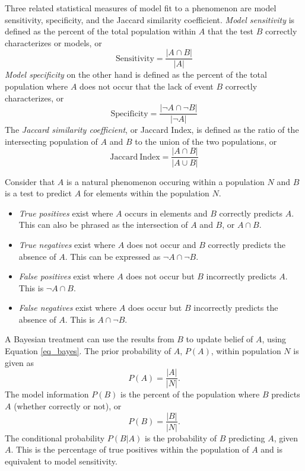\documentclass[12pt,letter]{article}
\begin{document}
Three related statistical measures of model fit to a phenomenon are model sensitivity, specificity, and the Jaccard similarity coefficient. \textit{Model sensitivity} is defined as the percent of the total population within $A$ that the test $B$ correctly characterizes or models, or
\begin{equation}
\mathrm{Sensitivity} = \frac{|A\cap B|}{|A|}\label{eq_sensitivity}
\end{equation}
\textit{Model specificity} on the other hand is defined as the percent of the total population where $A$ does not occur that the lack of event $B$ correctly characterizes, or 
\begin{equation}
\mathrm{Specificity} = \frac{|\neg A\cap \neg B|}{|\neg A|}
\end{equation}
The \textit{Jaccard similarity coefficient}, or Jaccard Index, is defined as the ratio of the intersecting population of $A$ and $B$ to the union of the two populations, or
\begin{equation}
\mathrm{Jaccard~Index} = \frac{|A\cap B|}{|A\cup B|}
\end{equation}

Consider that $A$ is a natural phenomenon occuring within a population $N$ and $B$ is a test to predict $A$ for elements within the population $N$. 
\begin{itemize}
\item \textit{True positives} exist where $A$ occurs in elements and $B$ correctly predicts $A$. This can also be phrased as the intersection of $A$ and $B$, or $A\cap B$.
\item \textit{True negatives} exist where $A$ does not occur and $B$ correctly predicts the absence of $A$. This can be expressed as $\neg A\cap\neg B$.
\item \textit{False positives} exist where $A$ does not occur but $B$ incorrectly predicts $A$. This is $\neg A\cap B$.
\item \textit{False negatives} exist where $A$ does occur but $B$ incorrectly predicts the absence of $A$. This is $A\cap\neg B$.
\end{itemize}

A Bayesian treatment can use the results from $B$ to update belief of $A$, using Equation \ref{eq_bayes}. The prior probability of $A$, $P(A)$, within population $N$ is given as
\begin{equation}
P(A)=\frac{|A|}{|N|}.\label{eq_PA}
\end{equation}
The model information $P(B)$ is the percent of the population where $B$ predicts $A$ (whether correctly or not), or 
\begin{equation}
P(B)=\frac{|B|}{|N|}.\label{eq_PB}
\end{equation}
The conditional probability $P(B|A)$ is the probability of $B$ predicting $A$, given $A$. This is the percentage of true positives within the population of $A$ and is equivalent to model sensitivity.
\end{document}
